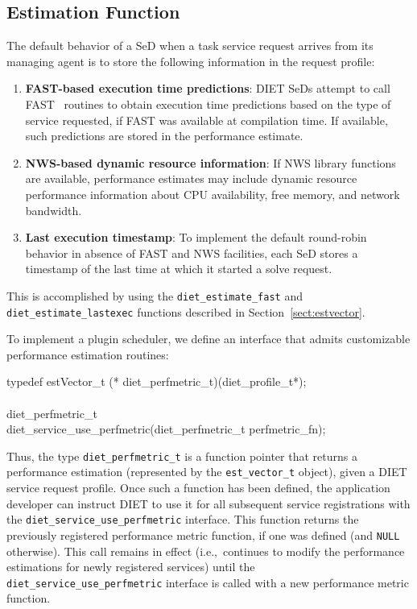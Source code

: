\subsection{Estimation Function}\label{sect:est_fn}

The default behavior of a SeD when a task service request arrives from
its managing agent is to store the following information in the
request profile:
\begin{enumerate}
\item \textbf{FAST-based execution time predictions}: DIET SeDs
  attempt to call FAST~\cite{Qui02}
  routines to obtain execution time predictions based on the type of
  service requested, if FAST was available at compilation time.  If
  available, such predictions are stored in the
  performance estimate.
\item \textbf{NWS-based dynamic resource information}: If NWS library
  functions are available, performance estimates may include dynamic
  resource performance information about CPU availability, free
  memory, and network bandwidth.
\item \textbf{Last execution timestamp}: To implement the default
  round-robin behavior in absence of FAST and NWS facilities, each SeD
  stores a timestamp of the last time at which it started a solve
  request.
\end{enumerate}
This is accomplished by using the \texttt{diet\_estimate\_fast} and
\texttt{diet\_estimate\_lastexec} functions described in
Section~\ref{sect:estvector}.

To implement a plugin scheduler, we define an
interface that admits customizable performance estimation routines:
\begin{code}
  typedef estVector\_t (* diet\_perfmetric\_t)(diet\_profile\_t*);\\
  \\
  diet\_perfmetric\_t\\
  diet\_service\_use\_perfmetric(diet\_perfmetric\_t perfmetric\_fn);\\
\end{code}
Thus, the type \texttt{diet\_perfmetric\_t} is a function pointer
that returns a performance estimation (represented by the
\texttt{est\_vector\_t} object), given a DIET service request
profile.  Once such a function has been defined, the application
developer can instruct DIET to use it for all subsequent service
registrations with the
\texttt{diet\_service\_use\_perfmetric} interface.  This function
returns the previously registered performance metric function, if one
was defined (and
\texttt{NULL} otherwise).  This call remains in effect
(i.e.,~continues to modify the performance estimations for newly
registered services) until the
\texttt{diet\_service\_use\_perfmetric} interface is called with a new
performance metric function.

